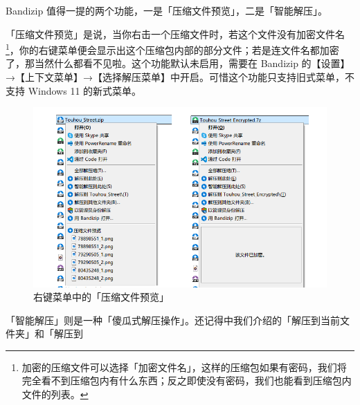 {Bandizip 值得一提的两个功能，一是「压缩文件预览」，二是「智能解压」。

「压缩文件预览」是说，当你右击一个压缩文件时，若这个文件没有加密文件名\footnote{加密的压缩文件可以选择「加密文件名」，这样的压缩包如果有密码，我们将完全看不到压缩包内有什么东西；反之即使没有密码，我们也能看到压缩包内文件的列表。}，你的右键菜单便会显示出这个压缩包内部的部分文件；若是连文件名都加密了，那当然什么都看不见啦。这个功能默认未启用，需要在 Bandizip 的【设置】→【上下文菜单】→【选择解压菜单】中开启。可惜这个功能只支持旧式菜单，不支持 Windows 11 的新式菜单。

\begin{figure}[htb!]
  \centering
  \includegraphics[width=.7\textwidth]{assets/software/Compressed_Preview.png}
  \caption{右键菜单中的「压缩文件预览」}
  \label{fig:Compressed_Preview}
\end{figure}

「智能解压」则是一种「傻瓜式解压操作」。还记得中我们介绍的「解压到当前文件夹」和「解压到 }
